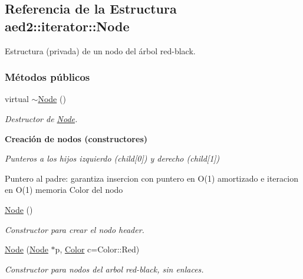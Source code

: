 \hypertarget{structaed2_1_1iterator_1_1Node}{\subsection{\-Referencia de la \-Estructura aed2\-:\-:iterator\-:\-:\-Node}
\label{structaed2_1_1iterator_1_1Node}
}


\-Estructura (privada) de un nodo del árbol red-\/black.  


\subsubsection*{\-Métodos públicos}
\begin{DoxyCompactItemize}
\item 
virtual \hyperlink{structaed2_1_1iterator_1_1Node_ab9a8f2970d15b72a4d1d20f8bf853d4b_ab9a8f2970d15b72a4d1d20f8bf853d4b}{$\sim$\-Node} ()
\begin{DoxyCompactList}\small\item\em \-Destructor de \hyperlink{structaed2_1_1iterator_1_1Node}{\-Node}. \end{DoxyCompactList}\end{DoxyCompactItemize}
\begin{Indent}{\bf \-Creación de nodos (constructores)}\par
{\em \-Punteros a los hijos izquierdo (child\mbox{[}0\mbox{]}) y derecho (child\mbox{[}1\mbox{]})

\-Puntero al padre\-: garantiza insercion con puntero en \-O(1) amortizado e iteracion en \-O(1) memoria \-Color del nodo }\begin{DoxyCompactItemize}
\item 
\hyperlink{structaed2_1_1iterator_1_1Node_a143f108a38e8990d7d60ad48dd521654_a143f108a38e8990d7d60ad48dd521654}{\-Node} ()
\begin{DoxyCompactList}\small\item\em \-Constructor para crear el nodo header. \end{DoxyCompactList}\item 
\hyperlink{structaed2_1_1iterator_1_1Node_a1f7307020ba416915f60d2dd938df845_a1f7307020ba416915f60d2dd938df845}{\-Node} (\hyperlink{structaed2_1_1iterator_1_1Node}{\-Node} $\ast$p, \hyperlink{classaed2_1_1iterator_aaa188f82ba585d8de525b1400242cf4f_aaa188f82ba585d8de525b1400242cf4f}{\-Color} c=\-Color\-::\-Red)
\begin{DoxyCompactList}\small\item\em \-Constructor para nodos del arbol red-\/black, sin enlaces. \end{DoxyCompactList}\end{DoxyCompactItemize}
\end{Indent}
